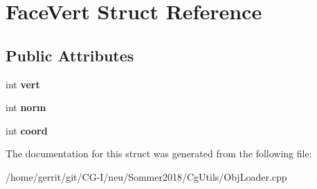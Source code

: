 \hypertarget{struct_face_vert}{}\section{Face\+Vert Struct Reference}
\label{struct_face_vert}
\subsection*{Public Attributes}
\begin{DoxyCompactItemize}
\item 
\mbox{\label{struct_face_vert_ac0a0290d4a0b2fe2f0ab4c9340d76ea8}} 
int {\bfseries vert}
\item 
\mbox{\label{struct_face_vert_aed28b377e7ec090e7d863bce44731767}} 
int {\bfseries norm}
\item 
\mbox{\label{struct_face_vert_a0cf44ab82ef14027f8e12854422d164e}} 
int {\bfseries coord}
\end{DoxyCompactItemize}


The documentation for this struct was generated from the following file\+:\begin{DoxyCompactItemize}
\item 
/home/gerrit/git/\+C\+G-\/\+I/neu/\+Sommer2018/\+Cg\+Utils/Obj\+Loader.\+cpp\end{DoxyCompactItemize}
